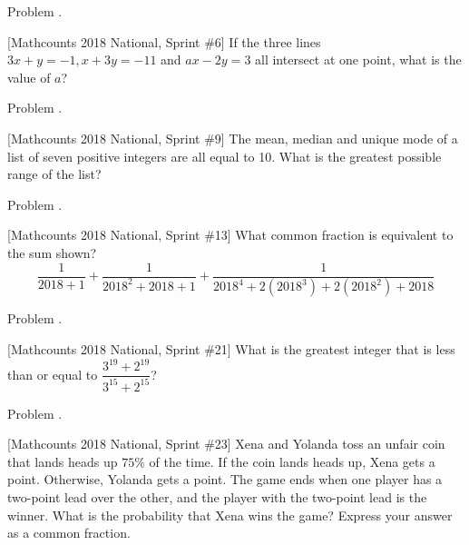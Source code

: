 \documentclass[9pt]{beamer}
\newcounter{problem}[section]
\begin{document}
\begin{frame}[t, fragile]{Problem \thesection.\theproblem}
    \begin{block}{}[Mathcounts 2018 National, Sprint \#6]
    If the three lines $ 3x+y=-1,x+3y=-11 $ and $ ax-2y=3 $ all intersect at one point, what is the value of $ a $?
    
    \end{block}
\end{frame}

\begin{frame}[t, fragile]{Problem \thesection.\theproblem}
    \begin{block}{}[Mathcounts 2018 National, Sprint \#9]
    The mean, median and unique mode of a list of seven positive integers are all equal to 10. What is the greatest possible range of the list?
    
    \end{block}
\end{frame}


\begin{frame}[t, fragile]{Problem \thesection.\theproblem}
    \begin{block}{}[Mathcounts 2018 National, Sprint \#13]
    What common fraction is equivalent to the sum shown?
    \[ \frac{1}{2018+1} + \frac{1}{2018^2+2018+1} + \frac{1}{2018^4+2(2018^3)+2(2018^2)+2018} \]
    
    \end{block}
\end{frame}


\begin{frame}[t, fragile]{Problem \thesection.\theproblem}
    \begin{block}{}[Mathcounts 2018 National, Sprint \#21]
    What is the greatest integer that is less than or equal to $ \dfrac{3^{19} + 2^{19}}{3^{15} + 2^{15}} $?
    
    \end{block}
\end{frame}


\begin{frame}[t, fragile]{Problem \thesection.\theproblem}
    \begin{block}{}[Mathcounts 2018 National, Sprint \#23]
    Xena and Yolanda toss an unfair coin that lands heads up $ 75\% $ of the time. If the coin lands heads up, Xena gets a point. Otherwise, Yolanda gets a point. The game ends when one player has a two-point lead over the other, and the player with the two-point lead is the winner. What is the probability that Xena wins the game? Express your answer as a common fraction.
    
    \end{block}
\end{frame}
\end{document}
